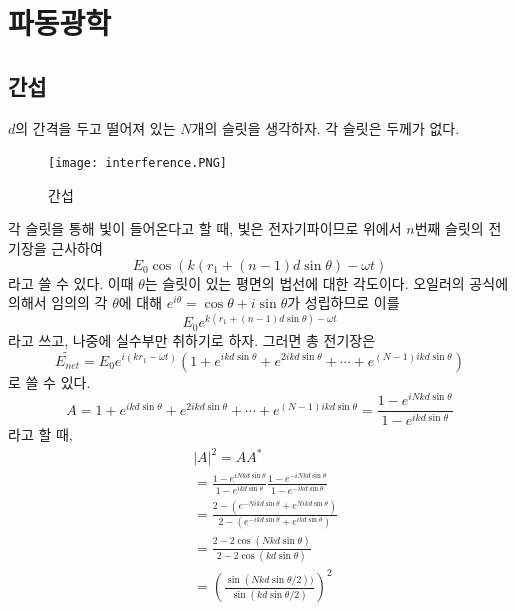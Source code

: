 \chapter{파동광학}
\section{간섭}
$d$의 간격을 두고 떨어져 있는 $N$개의 슬릿을 생각하자. 각 슬릿은 두께가 없다. 
\begin{figure}[h]
\centering\texttt{[image: interference.PNG]}
\caption{간섭}
\label{fig:interference} %
\end{figure}
각 슬릿을 통해 빛이 들어온다고 할 때, 빛은 전자기파이므로 위에서 $n$번째 슬릿의 전기장을 근사하여
\begin{equation}
E_0\cos(k(r_1+(n-1)d\sin\theta)-\omega t)
\end{equation}라고 쓸 수 있다. 이때 $\theta$는 슬릿이 있는 평면의 법선에 대한 각도이다. 오일러의 공식에 의해서 임의의 각 $\theta$에 대해
$e^{i\theta} = \cos\theta +i\sin\theta$가 성립하므로 이를 
\begin{equation}
E_0e^{k(r_1+(n-1)d\sin\theta)-\omega t}
\end{equation}
라고 쓰고, 나중에 실수부만 취하기로 하자. 그러면 총 전기장은
\begin{equation}
\tilde{E_{net}}=E_0e^{i(kr_1-\omega t)} (1+e^{ikd\sin\theta}+e^{2ikd\sin\theta}+\cdots +e^{(N-1)ikd\sin\theta})
\end{equation}
로 쓸 수 있다. 
\begin{equation}
A=1+e^{ikd\sin\theta}+e^{2ikd\sin\theta}+\cdots +e^{(N-1)ikd\sin\theta}=\frac{1-e^{iNkd\sin\theta}}{1-e^{ikd\sin\theta}}
\end{equation}
라고 할 때, 
\begin{align}
&|A|^2=AA^* \\
&=\frac{1-e^{iNkd\sin\theta}}{1-e^{ikd\sin\theta}}\frac{1-e^{-iNkd\sin\theta}}{1-e^{-ikd\sin\theta}} \\
&=\frac{2-(e^{-Nikd\sin\theta} +e^{Nikd\sin\theta})}{2-(e^{-ikd\sin\theta}+e^{ikd\sin\theta})} \\
&= \frac{2-2\cos(Nkd\sin\theta)}{2-2\cos(kd\sin\theta)}\\
&=\left(\frac{\sin(Nkd\sin\theta/2))}{\sin(kd\sin\theta/2)}\right )^2
\end{align}
